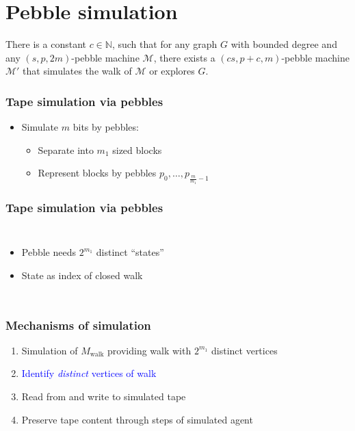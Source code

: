 \documentclass{beamer}
\begin{document}
\section{Pebble simulation}
\begin{frame}
  \begin{mdframed}
    \begin{theorem}
      There is a constant $c\in\mathbb{N}$, such that for any graph $G$
      with bounded degree and any $(s,p,2m)$-pebble machine $\mathcal{M}$,
      there exists a $(cs,p+c,m)$-pebble machine $\mathcal{M}'$ that simulates
      the walk of $\mathcal{M}$ or explores $G$.
    \end{theorem}
  \end{mdframed}
\end{frame}

\begin{frame}
  \frametitle{Tape simulation via pebbles}
  \begin{itemize}
    \item Simulate $m$ bits by pebbles:
      \begin{itemize}
        \item<3-> Separate into $m_{1}$ sized blocks
        \item<4-> Represent blocks by pebbles
          $p_{0},\dots,p_{\frac{m}{m_{1}}-1}$
      \end{itemize}
  \end{itemize}
\end{frame}

\begin{frame}
  \frametitle{Tape simulation via pebbles}
  
  \begin{columns}
    \begin{itemize}
      \item Pebble needs $2^{m_{1}}$ distinct \enquote{states}
      \item State as index of closed walk
    \end{itemize}
    \resizebox{\textwidth}{!}{}
  \end{columns}
\end{frame}

\begin{frame}
  \frametitle{Mechanisms of simulation}
  \begin{enumerate}
    \item Simulation of $M_{\text{walk}}$ providing
        walk with $2^{m_{1}}$ distinct vertices
    \item \textcolor<2->{blue}{Identify \emph{distinct} vertices of walk}
    \item Read from and write to simulated tape
    \item Preserve tape content through steps of simulated agent
  \end{enumerate}
\end{frame}
\end{document}
